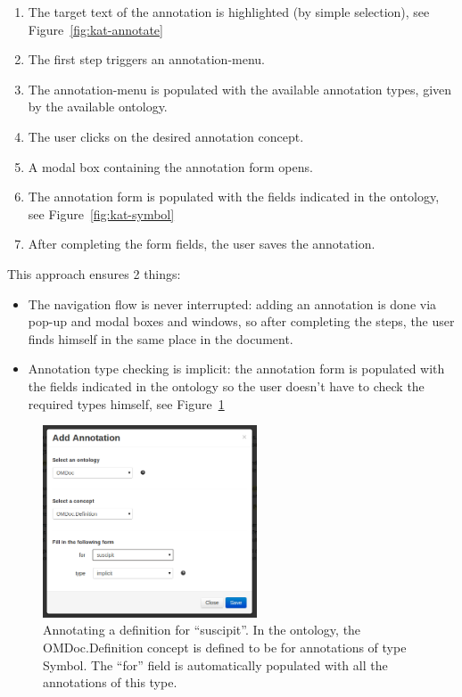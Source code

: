 \begin{enumerate}
\item The target text of the annotation is highlighted (by simple selection), see Figure~\ref{fig:kat-annotate}
\item The first step triggers an annotation-menu.
\item The annotation-menu is populated with the available annotation types, given by the
  available ontology.
\item The user clicks on the desired annotation concept.
\item A modal box containing the annotation form opens.
\item The annotation form is populated with the fields indicated in the ontology, see Figure~\ref{fig:kat-symbol}
\item After completing the form fields, the user saves the annotation.
\end{enumerate}
This approach ensures 2 things:
\begin{itemize}
\item The navigation flow is never interrupted: adding an annotation is done via pop-up
  and modal boxes and windows, so after completing the steps, the user finds himself in
  the same place in the document.
\item Annotation type checking is implicit: the annotation form is populated with the
  fields indicated in the ontology so the user doesn’t have to check the required types
  himself, see Figure~\ref{fig:kat-definition}
\end{itemize}

\begin{figure}[ht]\centering
 \includegraphics[width=2.5in]{../PIC/add-definition}
 \caption{Annotating a definition for ``suscipit''. In the ontology, the OMDoc.Definition
   concept is defined to be for annotations of type Symbol. The ``for'' field is
   automatically populated with all the annotations of this type.}\label{fig:kat-definition}
\end{figure}

